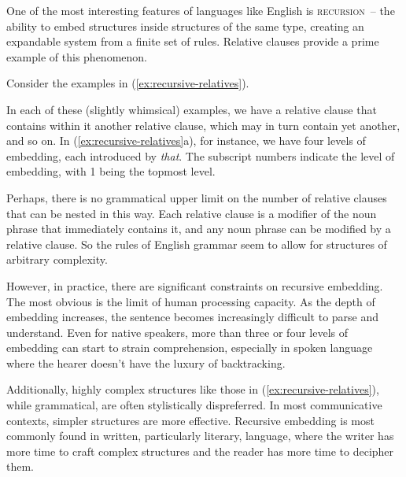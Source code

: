 One of the most interesting features of languages like English is \textsc{recursion}~-- the ability to embed structures inside structures of the same type, creating an expandable system from a finite set of rules. Relative clauses provide a prime example of this phenomenon.

Consider the examples in (\ref{ex:recursive-relatives}).
\ea \label{ex:recursive-relatives}
    \z
\z

In each of these (slightly whimsical) examples, we have a relative clause that contains within it another relative clause, which may in turn contain yet another, and so on. In (\ref{ex:recursive-relatives}a), for instance, we have four levels of embedding, each introduced by \textit{that}. The subscript numbers indicate the level of embedding, with 1 being the topmost level.

Perhaps, there is no grammatical upper limit on the number of relative clauses that can be nested in this way. Each relative clause is a modifier of the noun phrase that immediately contains it, and any noun phrase can be modified by a relative clause. So the rules of English grammar seem to allow for structures of arbitrary complexity.

However, in practice, there are significant constraints on recursive embedding. The most obvious is the limit of human processing capacity. As the depth of embedding increases, the sentence becomes increasingly difficult to parse and understand. Even for native speakers, more than three or four levels of embedding can start to strain comprehension, especially in spoken language where the hearer doesn't have the luxury of backtracking.

Additionally, highly complex structures like those in (\ref{ex:recursive-relatives}), while grammatical, are often stylistically dispreferred. In most communicative contexts, simpler structures are more effective. Recursive embedding is most commonly found in written, particularly literary, language, where the writer has more time to craft complex structures and the reader has more time to decipher them.

